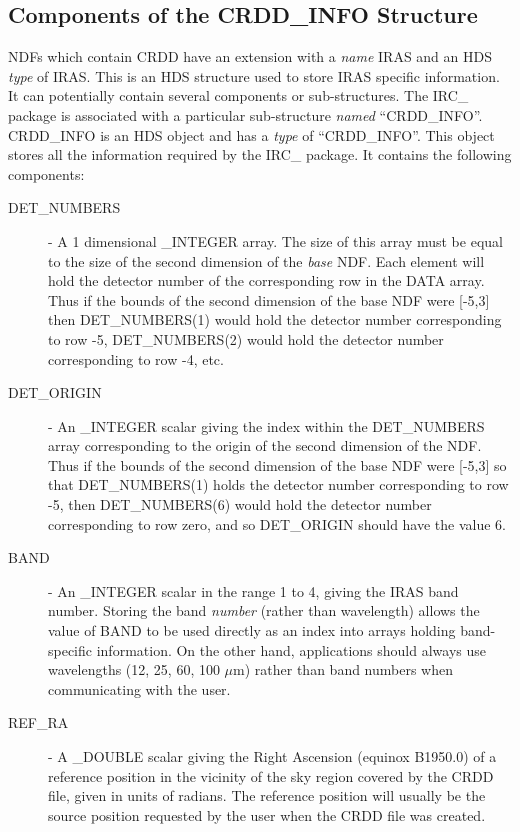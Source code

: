 \subsection {Components of the CRDD\_INFO Structure}
\label{SEC:CRDD_INFO}
NDFs which contain CRDD have an extension with a {\em name} IRAS and
an HDS {\em type} of IRAS. This is an HDS structure used to store IRAS specific
information. It can potentially contain several components or sub-structures.
The IRC\_ package is associated with a particular sub-structure {\em named}
``CRDD\_INFO''. CRDD\_INFO is an HDS object and has a {\em type} of
``CRDD\_INFO''. This object stores all the information required by the IRC\_
package. It contains the following components:

\begin {description}

\item [DET\_NUMBERS] - A 1 dimensional \_INTEGER array. The size of this array
must be equal to the size of the second dimension of the {\em base} NDF. Each
element will hold the detector number of the corresponding row in the DATA
array. Thus if the bounds of the second dimension of the base NDF were [-5,3]
then DET\_NUMBERS(1) would hold the detector number corresponding to row -5,
DET\_NUMBERS(2) would hold the detector number corresponding to row -4, etc.

\item [DET\_ORIGIN] - An \_INTEGER scalar giving the index within the
DET\_NUMBERS array corresponding to the origin of the second dimension of the
NDF. Thus if the bounds of the second dimension of the base NDF were [-5,3]
so that DET\_NUMBERS(1) holds the detector number corresponding to row -5, then
DET\_NUMBERS(6) would hold the detector number corresponding to row zero, and
so DET\_ORIGIN should have the value 6.

\item [BAND] - An \_INTEGER scalar in the range 1 to 4, giving the IRAS band
number. Storing the band {\em number} (rather than wavelength) allows the
value of BAND to be used directly as an index into arrays holding band-specific
information. On the other hand, applications should always use wavelengths
(12, 25, 60, 100 $\mu$m) rather than band numbers when communicating with the user.

\item [REF\_RA] - A \_DOUBLE scalar giving the Right Ascension (equinox B1950.0)
of a reference position in the vicinity of the sky region covered by the CRDD
file, given in units of radians. The reference position will usually be the
source position requested by the user when the CRDD file was created.


\end{description}
